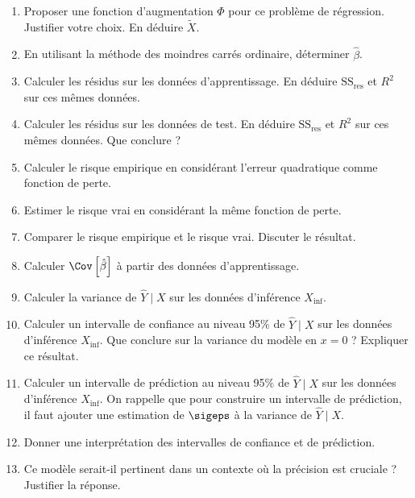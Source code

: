 \documentclass[]{../exercices}
\begin{document}
\begin{exercice}
		\begin{enumerate}
			\item Proposer une fonction d'augmentation $\Phi$ pour ce problème de régression. Justifier votre choix. En déduire $\tilde{X}$.
			\item En utilisant la méthode des moindres carrés ordinaire, déterminer $\hat{\beta}$.
			\item Calculer les résidus sur les données d'apprentissage. En déduire $\text{SS}_{\text{res}}$ et $R^2$ sur ces mêmes données.
			\item Calculer les résidus sur les données de test. En déduire $\text{SS}_{\text{res}}$ et $R^2$ sur ces mêmes données. Que conclure ?
			\item Calculer le risque empirique en considérant l'erreur quadratique comme fonction de perte.
			\item Estimer le risque vrai en considérant la même fonction de perte.
			\item Comparer le risque empirique et le risque vrai. Discuter le résultat.
			\item Calculer $\Cov \left[\hat{\beta}\right]$ à partir des données d'apprentissage.
			\item Calculer la variance de $\hat{Y} \mid X$ sur les données d'inférence $X_{\text{inf}}$.
			\item Calculer un intervalle de confiance au niveau 95\% de $\hat{Y} \mid X$ sur les données d'inférence $X_{\text{inf}}$. Que conclure sur la variance du modèle en $x = 0$ ? Expliquer ce résultat.
			\item Calculer un intervalle de prédiction au niveau 95\% de $\hat{Y} \mid X$ sur les données d'inférence $X_{\text{inf}}$. On rappelle que pour construire un intervalle de prédiction, il faut ajouter une estimation de $\sigeps$ à la variance de $\hat{Y} \mid X$.
			\item Donner une interprétation des intervalles de confiance et de prédiction.
			\item Ce modèle serait-il pertinent dans un contexte où la précision est cruciale ? Justifier la réponse.
		\end{enumerate}
	\end{exercice}
\end{document}
